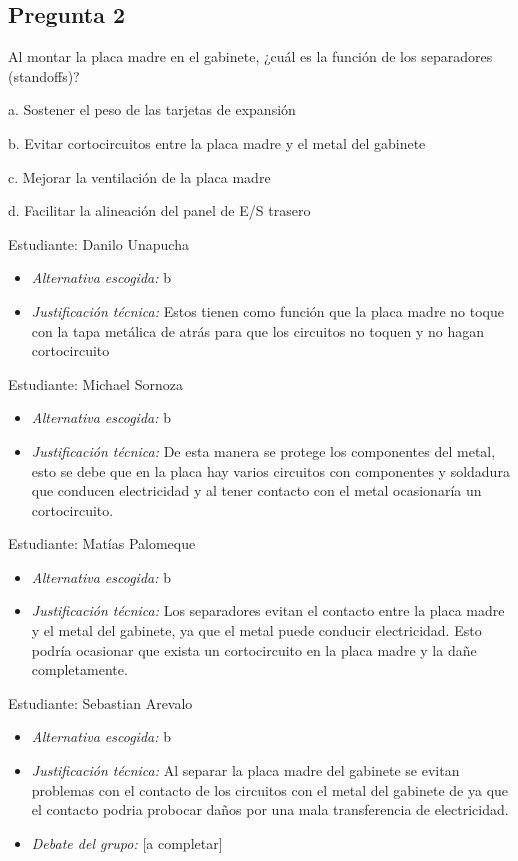 \documentclass{article}
\begin{document}
\subsection{Pregunta 2}
\label{sec:orgeb4adcc}
Al montar la placa madre en el gabinete, ¿cuál es la función de los separadores (standoffs)?

a. Sostener el peso de las tarjetas de expansión

b. Evitar cortocircuitos entre la placa madre y el metal del gabinete

c. Mejorar la ventilación de la placa madre

d. Facilitar la alineación del panel de E/S trasero

Estudiante: Danilo Unapucha

\begin{itemize}
\item \emph{Alternativa escogida:} b
\item \emph{Justificación técnica:} Estos tienen como función que la placa
madre no toque con la tapa metálica de atrás para que los circuitos
no toquen y no hagan cortocircuito
\end{itemize}

Estudiante: Michael Sornoza

\begin{itemize}
\item \emph{Alternativa escogida:} b
\item \emph{Justificación técnica:} De esta manera se protege los componentes del metal, esto se debe que en
la placa hay varios circuitos con componentes y soldadura que conducen electricidad y al tener contacto
con el metal ocasionaría un cortocircuito.
\end{itemize}

Estudiante: Matías Palomeque

\begin{itemize}
\item \emph{Alternativa escogida:} b
\item \emph{Justificación técnica:} Los separadores evitan el contacto  entre
la placa madre y el metal del gabinete, ya que el metal puede
conducir electricidad. Esto podría ocasionar que exista un
cortocircuito en la placa madre y la dañe completamente.
\end{itemize}

Estudiante: Sebastian Arevalo

\begin{itemize}
\item \emph{Alternativa escogida:} b
\item \emph{Justificación técnica:} Al separar la placa madre del gabinete se
evitan problemas con el contacto de los circuitos con el metal del
gabinete de ya que el contacto podria probocar daños por una mala
transferencia de electricidad.

\item \emph{Debate del grupo:} [a completar]
\end{itemize}
\end{document}
